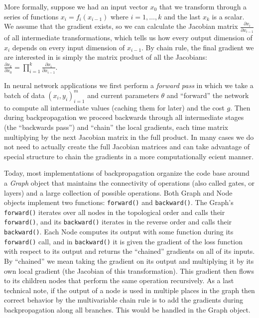 More formally, suppose we had an input vector $\displaystyle x_0$ that we transform through a series of functions $\displaystyle x_i = f_i(x_{i-1})$ where $i = 1,\dots,k$ and the last $\displaystyle x_k$ is a scalar. We assume that the gradient exists, so we can calculate the Jacobian matrix $\displaystyle \frac{\partial x_i}{\partial x_{i-1}}$ of all intermediate transformations, which tells us how every output dimension of $\displaystyle x_i$ depends on every input dimension of $\displaystyle x_{i-1}$. By chain rule, the final gradient we are interested in is simply the matrix product of all the Jacobians: $\displaystyle \frac{\partial x_k}{\partial x_0} = \prod_{i=1}^k \frac{\partial x_i}{\partial x_{i-1}}$.

In neural network applications we first perform a \textit{forward pass} in which we take a batch of data $\displaystyle (x_i, y_i)_{i=1}^m$ and current parameters $\displaystyle \theta$ and “forward” the network to compute all intermediate values (caching them for later) and the cost $\displaystyle g$.  Then during backpropagation we proceed backwards through all intermediate stages (the “backwards pass”) and “chain” the local gradients, each time matrix multiplying by the next Jacobian matrix in the full product. In many cases we do not need to actually create the full Jacobian matrices and can take advantage of special structure to chain the gradients in a more computationally ecient manner.

Today, most implementations of backpropagation organize the code base around a \textit{Graph} object that maintains the connectivity of operations (also called gates, or layers) and a large collection of possible operations. Both Graph and Node objects implement two functions: \texttt{forward()} and \texttt{backward()}. The Graph’s \texttt{forward()} iterates over all nodes in the topological order and calls their \texttt{forward()}, and its \texttt{backward()} iterates in the reverse order and calls their \texttt{backward()}. Each Node computes its output with some function during its \texttt{forward()} call, and in \texttt{backward()} it is given the gradient of the loss function with respect to its output and returns the “chained” gradients on all of its inputs. By “chained” we mean taking the gradient on its output and multiplying it by its own local gradient (the Jacobian of this transformation). This gradient then flows to its children nodes that perform the same operation recursively. As a last technical note, if the output of a node is used in multiple places in the graph then correct behavior by the multivariable chain rule is to add the gradients during backpropagation along all branches. This would be handled in the Graph object.

